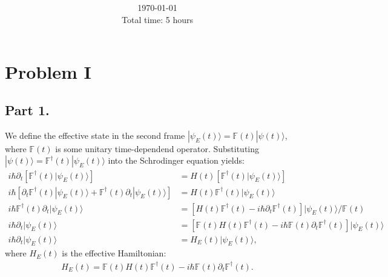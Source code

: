 \documentclass[letterpaper,11pt,twoside]{article}
\title{\textbf{\assignment}\\\course\\{\Large\institution}}
\author{\autor}
\date{\today\\Total time: 5 hours}
\newcommand{\ket}[1]{|#1\rangle}
\begin{document}
\pagestyle{mainstyle}
\maketitle
\section*{Problem I}
%
\subsection*{Part 1.}
We define the effective state in the second frame $\ket{\psi_E(t)}=\mathbb{F}(t)\ket{\psi(t)}$, where $\mathbb{F}(t)$ is some unitary time-dependend operator.
Substituting $\ket{\psi(t)}=\mathbb{F}^\dagger(t)\ket{\psi_E(t)}$ into the Schrodinger equation yields:
\begin{align*}
  i\hbar\partial_t\left[\mathbb{F}^\dagger(t)\ket{\psi_E(t)}\right]&=H(t)\left[\mathbb{F}^\dagger(t)\ket{\psi_E(t)}\right]\\
  i\hbar\left[\partial_t\mathbb{F}^\dagger(t)\ket{\psi_E(t)}+\mathbb{F}^\dagger(t)\partial_t\ket{\psi_E(t)}\right]&=H(t)\mathbb{F}^\dagger(t)\ket{\psi_E(t)}\\
  i\hbar\mathbb{F}^\dagger(t)\partial_t\ket{\psi_E(t)}&=\left[H(t)\mathbb{F}^\dagger(t)-i\hbar\partial_t\mathbb{F}^\dagger(t)\right]\ket{\psi_E(t)}\biggr/\mathbb{F}(t)\\
  i\hbar\partial_t\ket{\psi_E(t)}&=\left[\mathbb{F}(t)H(t)\mathbb{F}^\dagger(t)-i\hbar\mathbb{F}(t)\partial_t\mathbb{F}^\dagger(t)\right]\ket{\psi_E(t)}\\
  i\hbar\partial_t\ket{\psi_E(t)}&=H_E(t)\ket{\psi_E(t)},
\end{align*}
where $H_E(t)$ is the effective Hamiltonian:
\begin{align*}
  H_E(t)=\mathbb{F}(t)H(t)\mathbb{F}^\dagger(t)-i\hbar\mathbb{F}(t)\partial_t\mathbb{F}^\dagger(t).
\end{align*}
%
\end{document}
